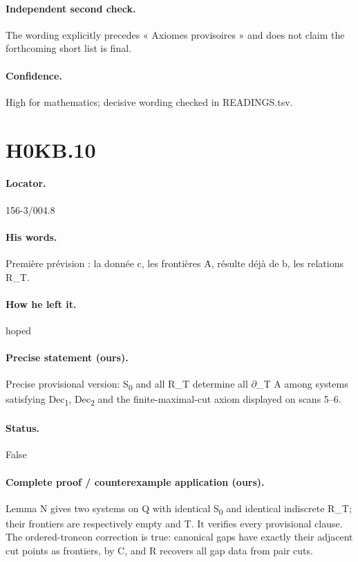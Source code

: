 \paragraph{Independent second check.} The wording explicitly precedes « Axiomes provisoires » and does not claim the forthcoming short list is final.

\paragraph{Confidence.} High for mathematics; decisive wording checked in READINGS.tsv.

\section*{H0KB.10}\label{statement:H0KB.10}
\paragraph{Locator.} 156-3/004.8

\paragraph{His words.} Première prévision : la donnée c, les frontières Ȧ, résulte déjà de b, les relations R\_T.

\paragraph{How he left it.} hoped

\paragraph{Precise statement (ours).} Precise provisional version: S\textsubscript{0} and all R\_T determine all \ensuremath{\partial}\_T A among systems satisfying Dec\textsubscript{1}, Dec\textsubscript{2} and the finite-maximal-cut axiom displayed on scans 5–6.

\paragraph{Status.} False

\paragraph{Complete proof / counterexample application (ours).} Lemma N gives two systems on Q with identical S\textsubscript{0} and identical indiscrete R\_T; their frontiers are respectively empty and T. It verifies every provisional clause. The ordered-troncon correction is true: canonical gaps have exactly their adjacent cut points as frontiers, by C, and R recovers all gap data from pair cuts.

